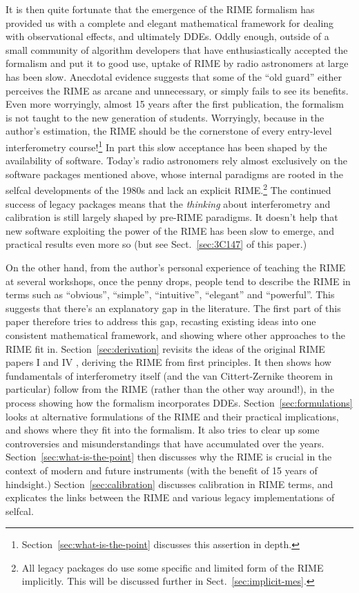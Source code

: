 \documentclass[]{aa}
\begin{document}
It is then quite fortunate that the emergence of the RIME formalism has provided us with a complete and elegant mathematical framework for dealing with observational effects, and ultimately DDEs. Oddly enough, outside of a small community of algorithm developers that have enthusiastically accepted the formalism and put it to good use, uptake of RIME by radio astronomers at large has been slow. Anecdotal evidence suggests that some of the ``old guard'' either perceives the RIME as arcane and unnecessary, or simply fails to see its benefits. Even more worryingly, almost 15 years after the first publication, the formalism is not taught to the new generation of students. Worryingly, because in the author's estimation, the RIME should be the cornerstone of every entry-level interferometry course!\footnote{Section~\ref{sec:what-is-the-point} discusses this assertion in depth.} In part this slow acceptance has been shaped by the availability of software. Today's radio astronomers rely almost exclusively on the software packages mentioned above, whose internal paradigms are rooted in the selfcal developments of the 1980s and lack an explicit RIME.\footnote{All legacy packages do use some specific and limited form of the RIME implicitly. This will be discussed further in Sect.~\ref{sec:implicit-mes}.} The continued success of legacy packages means that the {\em thinking} about interferometry and calibration is still largely shaped by pre-RIME paradigms. It doesn't help that new software exploiting the power of the RIME has been slow to emerge, and practical results even more so (but see Sect.~\ref{sec:3C147} of this paper.)  

On the other hand, from the author's personal experience of teaching the RIME at several workshops, once the penny drops, people tend to describe the RIME in terms such as ``obvious'', ``simple'', ``intuitive'', ``elegant'' and ``powerful''. This suggests that there's an explanatory gap in the literature. The first part of this paper therefore tries to address this gap, recasting existing ideas into one consistent mathematical framework, and showing where other approaches to the RIME fit in. Section~\ref{sec:derivation} revisits the ideas of the original RIME papers I and IV \citep{ME1, ME4}, deriving the RIME from first principles. It then shows how fundamentals of interferometry itself (and the van Cittert-Zernike theorem in particular) follow from the RIME (rather than the other way around!), in the process showing how the formalism incorporates DDEs. Section~\ref{sec:formulations} looks at alternative formulations of the RIME and their practical implications, and shows where they fit into the formalism. It also tries to clear up some controversies and misunderstandings that have accumulated over the years. Section~\ref{sec:what-is-the-point} then discusses why the RIME is crucial in the context of modern and future instruments (with the benefit of 15 years of hindsight.) Section~\ref{sec:calibration} discusses calibration in RIME terms, and explicates the links between the RIME and various legacy implementations of selfcal. 
\end{document}
